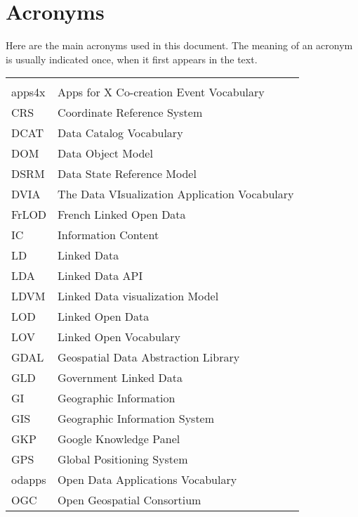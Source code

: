 

\chapter*{Acronyms}

Here are the main acronyms used in this document. The meaning of an acronym is usually indicated once, when it first appears in the text. 


\begin{longtable}{lp{11cm}}
  &\\
  apps4x	 & Apps for X Co-creation Event Vocabulary\\
  CRS &  Coordinate Reference System\\
  
  DCAT & Data Catalog Vocabulary\\
  DOM  & Data Object Model \\
  DSRM & Data State Reference Model \\
  DVIA & The Data VIsualization Application Vocabulary\\
  
  FrLOD &  French Linked Open Data  \\
  
  IC & Information Content   \\
  LD  &  Linked Data\\
  LDA &  Linked Data API \\
  LDVM & Linked Data visualization Model \\
  LOD &  Linked Open Data\\ 
  
  
  LOV &  Linked Open Vocabulary\\
  
  GDAL& Geospatial Data Abstraction Library \\
  GLD &  Government Linked Data\\
  GI  &  Geographic Information\\
  GIS &  Geographic Information System\\
  GKP &  Google Knowledge Panel \\
  GPS &  Global Positioning System \\
  
  odapps	 & Open Data Applications Vocabulary\\
  OGC &  Open Geospatial Consortium\\
  

\end{longtable}
